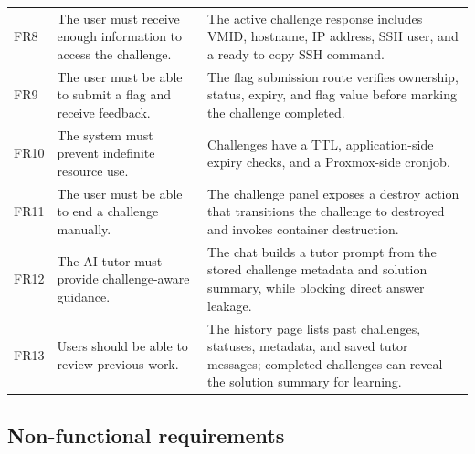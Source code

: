 \begin{longtable}{@{}p{} p{} p{}@{}}
FR8 &
The user must receive enough information to access the challenge. &
The active challenge response includes VMID, hostname, IP address, SSH user, and a ready to copy SSH command. \\

FR9 &
The user must be able to submit a flag and receive feedback. &
The flag submission route verifies ownership, status, expiry, and flag value before marking the challenge completed. \\

FR10 &
The system must prevent indefinite resource use. &
Challenges have a TTL, application-side expiry checks, and a Proxmox-side cronjob. \\

FR11 &
The user must be able to end a challenge manually. &
The challenge panel exposes a destroy action that transitions the challenge to destroyed and invokes container destruction. \\

FR12 &
The AI tutor must provide challenge-aware guidance. &
The chat builds a tutor prompt from the stored challenge metadata and solution summary, while blocking direct answer leakage. \\

FR13 &
Users should be able to review previous work. &
The history page lists past challenges, statuses, metadata, and saved tutor messages; completed challenges can reveal the solution summary for learning. \\

\end{longtable}

\subsection{Non-functional requirements}\label{sec:non_functional_requirements}

